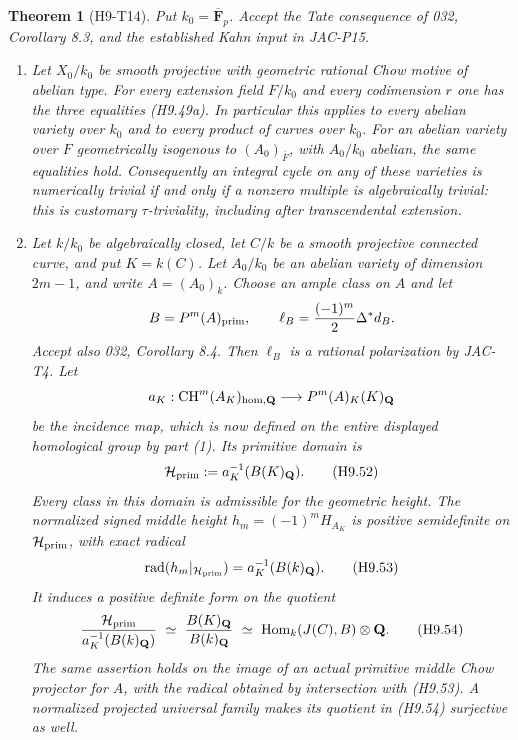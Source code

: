 \documentclass[11pt,a4paper]{article}
\newtheorem{theorem}{Theorem}[section]
\begin{document}
\begin{theorem}[H9-T14]\label{h9:T14}
Put $k_0=\overline{\mathbf F}_p$. Accept the Tate consequence of
032, Corollary 8.3, and the established Kahn input in JAC-P15.

\begin{enumerate}
\item
Let $X_0/k_0$ be smooth projective with geometric rational Chow
motive of abelian type. For every extension field $F/k_0$ and every
codimension $r$ one has the three equalities (H9.49a). In particular
this applies to every
abelian variety over $k_0$ and to every product of curves over $k_0$.
For an abelian variety over $F$ geometrically isogenous to
$(A_0)_{\overline F}$, with $A_0/k_0$ abelian, the same equalities
hold. Consequently an integral
cycle on any of these varieties is numerically trivial if and only
if a nonzero multiple is algebraically trivial: this is customary
$\tau$-triviality, including after transcendental extension.

\item
Let $k/k_0$ be algebraically closed, let $C/k$ be a smooth projective
connected curve, and put $K=k(C)$. Let $A_0/k_0$ be an abelian
variety of dimension $2m-1$, and write $A=(A_0)_k$. Choose an ample
class on $A$ and let
\[
 B=P^m(A)_{\rm prim},\qquad
 \ell_B=\frac{(-1)^m}{2}\Delta^*d_B.
\]
Accept also 032, Corollary 8.4. Then $\ell_B$ is a rational
polarization by JAC-T4. Let
\[
 a_K:\operatorname{CH}^m(A_K)_{\rm hom,\mathbf Q}
          \longrightarrow P^m(A)_K(K)_{\mathbf Q}
\]
be the incidence map, which is now defined on the entire displayed
homological group by part (1). Its primitive domain is
\[
 \mathcal H_{\rm prim}
   :=a_K^{-1}(B(K)_{\mathbf Q}).
                                                               \tag{H9.52}
\]
Every class in this domain is admissible for the geometric height.
The normalized signed middle height
$h_m=(-1)^m H_{A_K}$ is positive semidefinite on
$\mathcal H_{\rm prim}$, with exact radical
\[
 \operatorname{rad}(h_m|_{\mathcal H_{\rm prim}})
      =a_K^{-1}(B(k)_{\mathbf Q}).                           \tag{H9.53}
\]
It induces a positive definite form on the quotient
\[
 \frac{\mathcal H_{\rm prim}}
       {a_K^{-1}(B(k)_{\mathbf Q})}
      \ \simeq\
 \frac{B(K)_{\mathbf Q}}{B(k)_{\mathbf Q}}
      \ \simeq\
 \operatorname{Hom}_k(J(C),B)\otimes\mathbf Q.               \tag{H9.54}
\]
The same assertion holds on the image of an actual primitive middle
Chow projector for $A$, with the radical obtained by intersection
with (H9.53). A normalized projected universal family makes its
quotient in (H9.54) surjective as well.
\end{enumerate}
\end{theorem}
\end{document}
